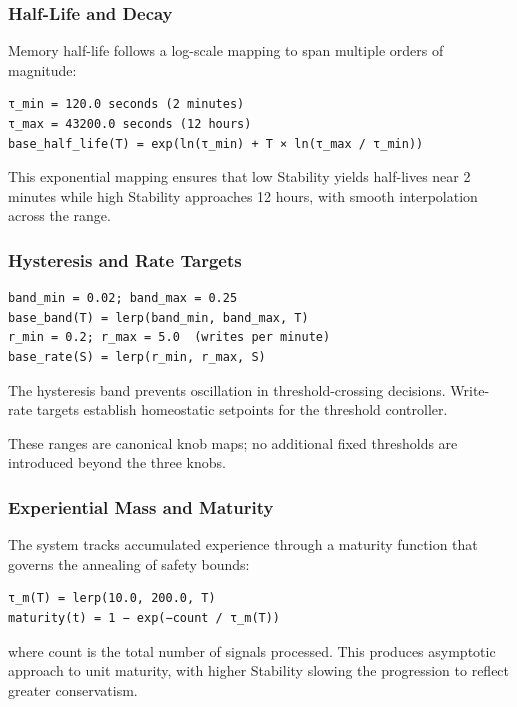 \documentclass[
  letterpaper,
  DIV=11,
  numbers=noendperiod]{scrartcl}
\begin{document}
\subsubsection{Half-Life and Decay}\label{half-life-and-decay}

Memory half-life follows a log-scale mapping to span multiple orders of
magnitude:

\begin{verbatim}
τ_min = 120.0 seconds (2 minutes)
τ_max = 43200.0 seconds (12 hours)
base_half_life(T) = exp(ln(τ_min) + T × ln(τ_max / τ_min))
\end{verbatim}

This exponential mapping ensures that low Stability yields half-lives
near 2 minutes while high Stability approaches 12 hours, with smooth
interpolation across the range.

\subsubsection{Hysteresis and Rate
Targets}\label{hysteresis-and-rate-targets}

\begin{verbatim}
band_min = 0.02; band_max = 0.25
base_band(T) = lerp(band_min, band_max, T)
r_min = 0.2; r_max = 5.0  (writes per minute)
base_rate(S) = lerp(r_min, r_max, S)
\end{verbatim}

The hysteresis band prevents oscillation in threshold-crossing
decisions. Write-rate targets establish homeostatic setpoints for the
threshold controller.

These ranges are canonical knob maps; no additional fixed thresholds are
introduced beyond the three knobs.

\subsubsection{Experiential Mass and
Maturity}\label{experiential-mass-and-maturity}

The system tracks accumulated experience through a maturity function
that governs the annealing of safety bounds:

\begin{verbatim}
τ_m(T) = lerp(10.0, 200.0, T)
maturity(t) = 1 − exp(−count / τ_m(T))
\end{verbatim}

where count is the total number of signals processed. This produces
asymptotic approach to unit maturity, with higher Stability slowing the
progression to reflect greater conservatism.
\end{document}
